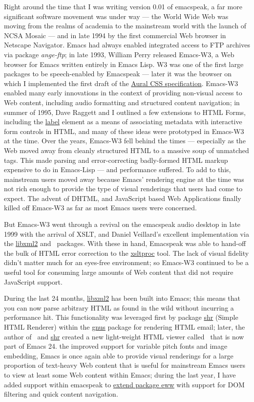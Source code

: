 \documentclass[11pt]{article}
\begin{document}
Right around the time that I was writing version 0.01 of
emacspeak, a far more significant software movement was under way
— the World Wide Web was moving from the realms of academia to
the mainstream world with the launch of NCSA Mosaic — and in late
1994 by the first commercial Web browser in Netscape
Navigator. Emacs had always enabled integrated access to FTP
archives via package \emph{ange-ftp}; in late 1993, William Perry
released Emacs-W3, a Web browser for Emacs written entirely in
Emacs Lisp. W3 was one of the first large packages to be
speech-enabled by Emacspeak — later it was the browser on which I
implemented the first draft of the
\href{http://www.w3.org/TR/CSS2/aural.html}{Aural CSS
specification}. Emacs-W3 enabled many early innovations in the
context of providing non-visual access to Web content, including
audio formatting and structured content navigation; in summer of
1995, Dave Raggett and I outlined a few extensions to HTML Forms,
including the \uline{label} element as a means of associating metadata
with interactive form controls in HTML, and many of these ideas
were prototyped in Emacs-W3 at the time. Over the years, Emacs-W3
fell behind the times — especially as the Web moved away from
cleanly structured HTML to a massive soup of unmatched tags. This
made parsing and error-correcting badly-formed HTML markup
expensive to do in Emacs-Lisp — and performance suffered. To add
to this, mainstream users moved away because Emacs' rendering
engine at the time was not rich enough to provide the type of
visual renderings that users had come to expect. The advent of
DHTML, and JavaScript based Web Applications finally killed off
Emacs-W3 as far as most Emacs users were concerned.

But Emacs-W3 went through a revival on the emacspeak audio
desktop in late 1999 with the arrival of XSLT, and Daniel
Veillard's excellent implementation via the \uline{libxml2} and
$_{\text{ }}$packages. With these in hand, Emacspeak was able to
hand-off the bulk of HTML error correction to the \uline{xsltproc}
tool. The lack of visual fidelity didn't matter much for an
eyes-free environment; so Emacs-W3 continued to be a useful tool
for consuming large amounts of Web content that did not require
JavaScript support.

During the last 24 months, \uline{libxml2} has been built into Emacs;
this means that you can now parse arbitrary HTML as found in the
wild without incurring a performance hit. This functionality was
leveraged first by package \uline{shr} (Simple HTML Renderer) within
the \uline{gnus} package for rendering HTML email; later, the author of
$_{\text{ }}$and \uline{shr} created a new light-weight HTML viewer called
$_{\text{ }}$that is now part of Emacs 24. the improved support for
variable pitch fonts and image embedding, Emacs is once again
able to provide visual renderings for a large proportion of
text-heavy Web content that is useful for mainstream Emacs users
to view at least some Web content within Emacs; during the last
year, I have added support within emacspeak to
\href{http://emacspeak.blogspot.com/2014/05/emacspeak-eww-updates-for-complete.html}{extend
package \uline{eww}} with support for DOM filtering and quick content
navigation.
\end{document}

